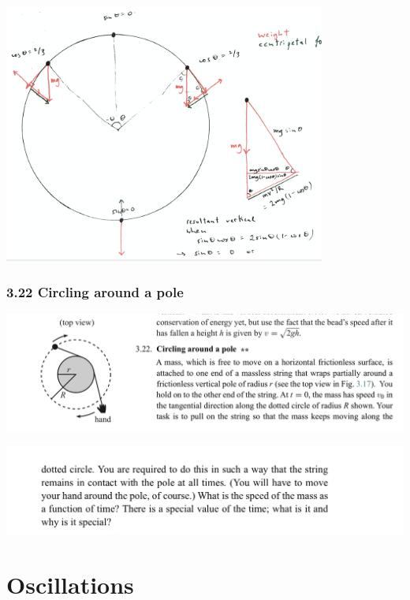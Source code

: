 \begin{mdframed}
  \includegraphics[width=300pt]{img/physics--classical-mechanics--morin--3-21-diag-2.png}
\end{mdframed}


\newpage
\subsubsection*{3.22 Circling around a pole}
\begin{mdframed}
  \includegraphics[width=400pt]{img/physics--classical-mechanics--morin--3-22.png}
\end{mdframed}
\begin{mdframed}
  \includegraphics[width=400pt]{img/physics--classical-mechanics--morin--3-22-2.png}
\end{mdframed}




\section{Oscillations}




